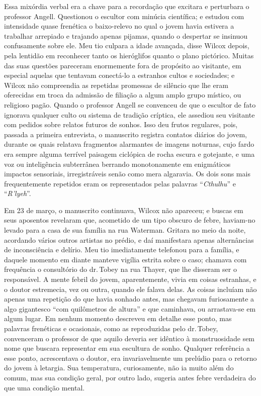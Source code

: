 Essa mixórdia verbal era a chave para a recordação que excitara e
perturbara o professor Angell. Questionou o escultor com minúcia
científica; e estudou com intensidade quase frenética o baixo-relevo no
qual o jovem havia estivera a trabalhar arrepiado e trajando apenas 
pijamas, quando o despertar se insinuou confusamente sobre ele. Meu
tio culpara a idade avançada, disse Wilcox depois, pela lentidão em
reconhecer tanto os hieróglifos quanto o plano pictórico. Muitas das
suas questões pareceram enormemente fora de propósito ao visitante, em
especial aquelas que tentavam conectá-lo a estranhos cultos e
sociedades; e Wilcox não compreendia as repetidas promessas de silêncio
que lhe eram oferecidas em troca da admissão de filiação a algum amplo
grupo místico, ou religioso pagão. Quando o professor Angell se
convenceu de que o escultor de fato ignorava qualquer culto ou sistema
de tradição críptica, ele assediou seu visitante com pedidos
sobre
relatos futuros de sonhos. Isso deu frutos regulares, pois, passada a
primeira entrevista, o manuscrito registra contatos diários do jovem,
durante os quais relatava fragmentos alarmantes de imagens noturnas,
cujo fardo era sempre alguma terrível paisagem ciclópica de rocha escura
e gotejante, e uma voz ou inteligência subterrânea berrando
monotonamente em enigmáticos impactos sensoriais, irregistráveis senão
como mera algaravia. Os dois sons mais frequentemente repetidos eram os
representados pelas palavras ``\emph{Cthulhu}'' e ``\emph{R'lyeh}''.

Em 23 de março, o manuscrito continuava, Wilcox não apareceu; e buscas em
seus aposentos revelaram que, acometido de um tipo obscuro de febre, 
haviam-no levado para a casa de sua família na rua Waterman. Gritara no
meio da noite, acordando vários outros artistas no prédio, e daí
manifestara apenas alternâncias de inconsciência e delírio. Meu tio
imediatamente telefonou para a família, e daquele momento em diante
manteve vigília estrita sobre o caso; chamava com frequência o
consultório do dr.\,Tobey na rua Thayer, que lhe disseram ser o
responsável. A mente febril do jovem, aparentemente, vivia em coisas
estranhas, e o doutor estremecia, vez ou outra, quando ele falava delas.
As coisas incluíam não apenas uma repetição do que havia sonhado antes,
mas chegavam furiosamente a algo gigantesco ``com quilômetros de altura'' e
que caminhava, ou arrastava-se em algum lugar. Em nenhum momento
descreveu em detalhe esse ponto, mas palavras frenéticas e ocasionais,
como as reproduzidas pelo dr.\,Tobey, convenceram o professor de que
aquilo deveria ser idêntico à monstruosidade sem nome que buscara
representar em sua escultura de sonho. Qualquer referência a esse ponto,
acrescentava o doutor, era invariavelmente um prelúdio para o retorno do
jovem à letargia. Sua temperatura, curiosamente, não ia muito além do
comum, mas sua condição geral, por outro lado, sugeria antes febre
verdadeira do que uma condição mental.

